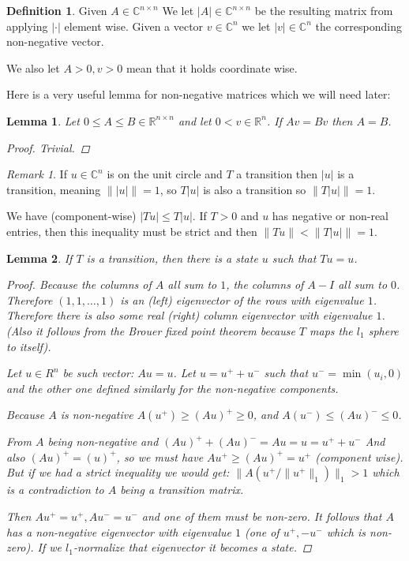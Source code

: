 \documentclass[a4paper,10pt]{article}
\newcommand{\C}{\mathbb{C}}
\newcommand{\R}{\mathbb{R}}
\newcommand{\gt}{>}
\newcommand{\lt}{<}
\theoremstyle{definition}
\newtheorem{mydef}{Definition}[section]
\theoremstyle{remark}
\newtheorem{remark}{Remark}
\theoremstyle{plain}
\newtheorem{lemma}{Lemma}[section]
\begin{document}
\begin{mydef}
\label{def:abs}
Given $A \in \C^{n \times n}$ We let $|A| \in \C^{n \times n}$ be the resulting
matrix from applying $|\cdot|$ element wise. Given a vector $v \in \C^n$ we let
$|v| \in \C^n$ the corresponding non-negative vector.

We also let $A \gt 0, v \gt 0$ mean that it holds coordinate wise. 
\end{mydef}

Here is a very useful lemma for non-negative matrices which we will need later:
\begin{lemma}
\label{lem:eqal_by_vector}
Let $0 \leq A \leq B \in \R^{n \times n}$ 
and let $0 \lt v \in \R^n$.
If $Av = Bv$ then $A = B$.
\begin{proof}
Trivial.
\end{proof}
\end{lemma}

\begin{remark}
\label{remark:abs}
If $u \in \C^n$ is on the unit circle and $T$ a transition then
$|u|$ is a transition, meaning $\||u|\|=1$, so $T|u|$ is also a transition
so $\|T|u|\|=1$.

We have (component-wise) $|Tu| \leq T|u|$. If $T>0$ and $u$ has negative or
non-real entries, then this inequality must be strict and
then $\|Tu\| \lt \|T|u|\| = 1$.
\end{remark}

\begin{lemma}
\label{lem:exist1}
If $T$ is a transition, then
there is a state $u$ such that $Tu = u$.
\begin{proof}
Because the columns of $A$ all sum to $1$, the columns of $A-I$ all sum to $0$.
Therefore $(1,1, \dots, 1)$ is an (left) eigenvector of the rows with eigenvalue $1$.
Therefore there is also some real (right) column eigenvector with eigenvalue $1$. 
(Also it follows from the Brouer fixed point theorem because $T$ maps the $l_1$
sphere to itself).

Let $u \in R^n$ be such vector: $Au=u$. Let $u = u^+ + u^-$ such that $u^- =
\min(u_i,0)$ and the other one defined similarly for the non-negative components.

Because $A$ is non-negative $A(u^+) \geq (Au)^+ \geq 0$,
and $A(u^-) \leq (Au)^- \leq 0$.

From $A$ being
non-negative and $(Au)^+ + (Au)^- = Au = u = u^+ + u^-$
And also $(A u)^+ = (u)^+$, so we must have $Au^+ \geq (Au)^+ = u^+$ 
(component wise). But if we had a strict inequality we would get:
$\|A(u^+/\|u^+\|_1)\|_1 > 1$ which is a contradiction to $A$ being a transition
matrix.

Then $A u^+ = u^+, A u^- = u^-$ and one of them must be non-zero. It follows
that $A$ has a non-negative eigenvector with eigenvalue $1$ (one of $u^+, -u^-$
which is non-zero). If we $l_1$-normalize that eigenvector it becomes a state.
\end{proof}
\end{lemma}
\end{document}
